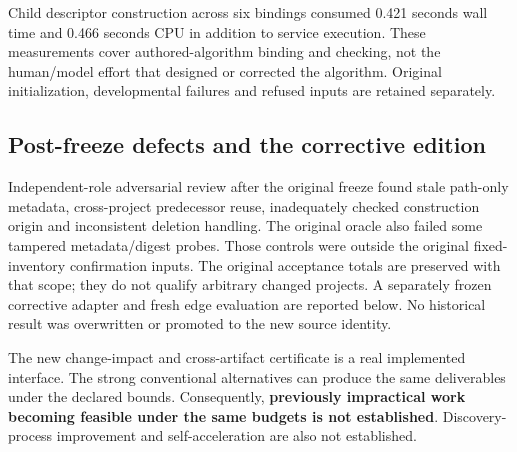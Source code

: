 Child descriptor construction across six bindings consumed 0.421 seconds wall time and 0.466 seconds CPU in addition to service execution. These measurements cover authored-algorithm binding and checking, not the human/model effort that designed or corrected the algorithm. Original initialization, developmental failures and refused inputs are retained separately.

\subsection{Post-freeze defects and the corrective edition}
Independent-role adversarial review after the original freeze found stale path-only metadata, cross-project predecessor reuse, inadequately checked construction origin and inconsistent deletion handling. The original oracle also failed some tampered metadata/digest probes. Those controls were outside the original fixed-inventory confirmation inputs. The original acceptance totals are preserved with that scope; they do not qualify arbitrary changed projects. A separately frozen corrective adapter and fresh edge evaluation are reported below. No historical result was overwritten or promoted to the new source identity.



The new change-impact and cross-artifact certificate is a real implemented interface. The strong conventional alternatives can produce the same deliverables under the declared bounds. Consequently, \textbf{previously impractical work becoming feasible under the same budgets is not established}. Discovery-process improvement and self-acceleration are also not established.
